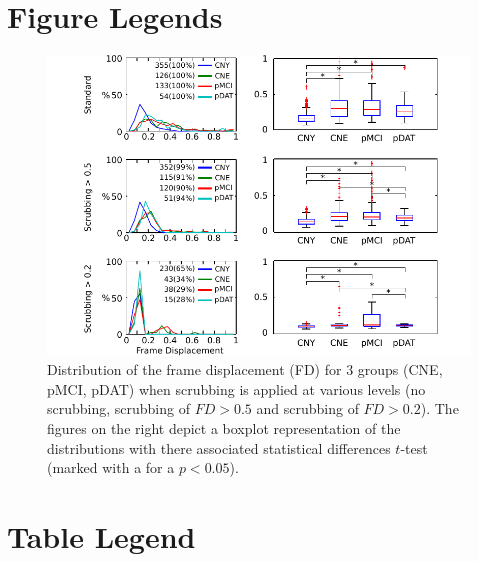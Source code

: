 \documentclass[authoryear]{elsarticle}
\begin{document}




\pagebreak

\section{Figure Legends}
\begin{figure}[!ht]
\begin{center}
\includegraphics[width=\linewidth]{../figures/figure_fd_distrib.pdf}
\end{center}
\caption{
Distribution of the frame displacement (FD) for 3 groups (CNE, pMCI, pDAT) when scrubbing is applied at various levels (no scrubbing, scrubbing of $FD>0.5$ and scrubbing of $FD>0.2$). The figures on the right depict a boxplot representation of the distributions with there associated statistical differences $t$-test (marked with a {\bf *} for a $p<0.05$).
}
\label{fig_dist}
\end{figure}



\section{Table Legend}

\clearpage
\appendix
\end{document}

